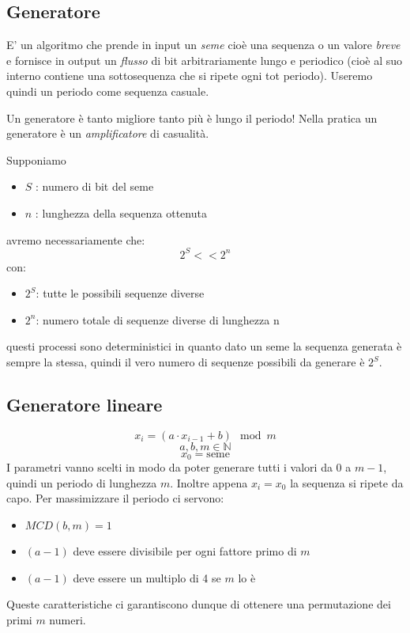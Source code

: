 \subsection{Generatore}
E' un algoritmo che prende in input un \emph{seme} cioè una sequenza o un valore \emph{breve} e fornisce in output un \emph{flusso} di bit arbitrariamente lungo e periodico (cioè al suo interno contiene una sottosequenza che si ripete ogni tot periodo). Useremo quindi un periodo come sequenza casuale.

Un generatore è tanto migliore tanto più è lungo il periodo! Nella pratica un generatore è un \emph{amplificatore} di casualità.

Supponiamo 
\begin{itemize}
    \item $S$ : numero di bit del seme
    \item $n$ : lunghezza della sequenza ottenuta
\end{itemize}
avremo necessariamente che:
$$ 2^{S} << 2^{n} $$
con:
\begin{itemize}
    \item $2^{S}$: tutte le possibili sequenze diverse
    \item $2^{n}$: numero totale di sequenze diverse di lunghezza n
\end{itemize}

questi processi sono deterministici in quanto dato un seme la sequenza generata è sempre la stessa, quindi il vero numero di sequenze possibili da generare è $2^{S}$.

\subsection{Generatore lineare}
$$ x_{i} = \left( a \cdot x_{i-1} + b \right) \mod m $$
$$ a,b,m \in \mathbb{N} $$
$$ x_{0} = \text{seme} $$
I parametri vanno scelti in modo da poter generare tutti i valori da $0$ a $m-1$, quindi un periodo di lunghezza $m$. Inoltre appena $x_{i} = x_{0}$ la sequenza si ripete da capo. Per massimizzare il periodo ci servono:
\begin{itemize}
    \item $MCD(b, m) = 1$
    \item $(a-1)$ deve essere divisibile per ogni fattore primo di $m$
    \item $(a-1)$ deve essere un multiplo di 4 se $m$ lo è
\end{itemize}
Queste caratteristiche ci garantiscono dunque di ottenere una permutazione dei primi $m$ numeri.

